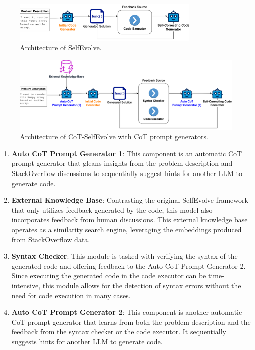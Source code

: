 \documentclass[a4paper,oneside]{book}
\begin{document}
\newpage
\begin{figure}[H]
    \centering
    \includegraphics[width=0.8\textwidth]{img/selfevolve_architecture}
    \caption{Architecture of SelfEvolve.}\label{fig:selfevolve_architecture}
\end{figure}

\begin{figure}[H]
    \centering
    \includegraphics[width=1.0\textwidth]{img/cot_selfdebug_architecture}
    \caption{Architecture of CoT-SelfEvolve with CoT prompt generators.}\label{fig:cot_selfdebug_architecture}
\end{figure}

\begin{enumerate}
    \item \textbf{Auto CoT Prompt Generator 1}: This component is an automatic CoT prompt generator that gleans insights from the problem description and StackOverflow discussions to sequentially suggest hints for another LLM to generate code.
    \item \textbf{External Knowledge Base}: Contrasting the original SelfEvolve framework that only utilizes feedback generated by the code, this model also incorporates feedback from human discussions. This external knowledge base operates as a similarity search engine, leveraging the embeddings produced from StackOverflow data.
    \item \textbf{Syntax Checker}: This module is tasked with verifying the syntax of the generated code and offering feedback to the Auto CoT Prompt Generator 2. Since executing the generated code in the code executor can be time-intensive, this module allows for the detection of syntax errors without the need for code execution in many cases.
    \item \textbf{Auto CoT Prompt Generator 2}: This component is another automatic CoT prompt generator that learns from both the problem description and the feedback from the syntax checker or the code executor. It sequentially suggests hints for another LLM to generate code.
\end{enumerate}
\end{document}
